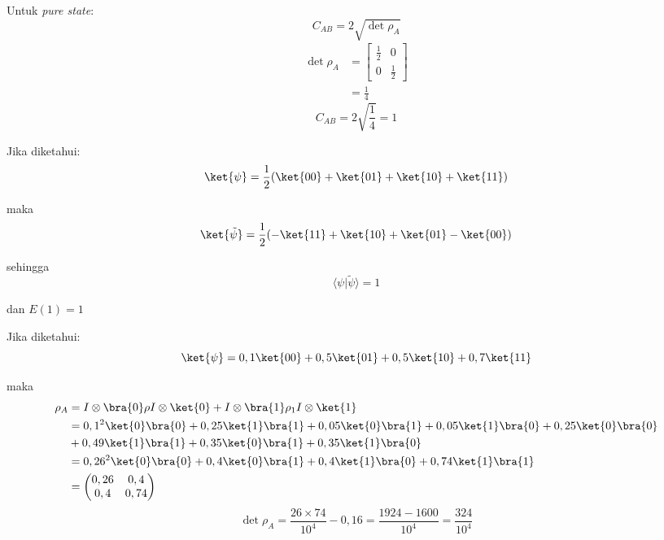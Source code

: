 \begin{enumerate}
	Untuk \textit{pure state}:
	\begin{equation}
		C_{AB}=2\sqrt{\det\rho_{A}}
	\end{equation}
	\begin{equation}
		\begin{aligned}
			\det\rho_{A}
			&=
			\begin{bmatrix}
				\frac{1}{2}&0\\
				0&\frac{1}{2}
			\end{bmatrix}\\
			&=\frac{1}{4}
		\end{aligned}
	\end{equation}
	\begin{equation}
		C_{AB}=2\sqrt{\frac{1}{4}}=1
	\end{equation}
	
	Jika diketahui:
	\begin{equation}
		\ket{\psi}=\frac{1}{2}(\ket{00}+\ket{01}+\ket{10}+\ket{11})
	\end{equation}
	
	maka
	\begin{equation}
		\ket{\tilde{\psi}}=\frac{1}{2}(-\ket{11}+\ket{10}+\ket{01}-\ket{00})
	\end{equation}
	
	sehingga
	\begin{equation}
		\langle\psi|\tilde{\psi}\rangle=1
	\end{equation}
	
	dan $E(1)=1$
	
	Jika diketahui:
	\begin{equation}
		\ket{\psi}=0,1\ket{00}+0,5\ket{01}+0,5\ket{10}+0,7\ket{11}
	\end{equation}
	
	maka
	\begin{equation}
		\begin{aligned}
			\rho_A
			&=I\otimes\bra{0}\rho I\otimes\ket{0} +I\otimes\bra{1}\rho_1I\otimes\ket{1}\\
			&=0,1^2\ket{0}\bra{0}+0,25\ket{1}\bra{1}+0,05\ket{0}\bra{1}+0,05\ket{1}\bra{0}+0,25\ket{0}\bra{0}\\
			&+0,49\ket{1}\bra{1}+0,35\ket{0}\bra{1}+0,35\ket{1}\bra{0}\\
			&=0,26^2\ket{0}\bra{0}+0,4\ket{0}\bra{1}+0,4\ket{1}\bra{0}+0,74\ket{1}\bra{1}\\
			&=
			\begin{pmatrix}
				0,26&0,4\\
				0,4&0,74
			\end{pmatrix}
		\end{aligned}
	\end{equation}
	\begin{equation}
		\det\rho_{A}=\frac{26\times74}{10^4}-0,16=\frac{1924-1600}{10^4}=\frac{324}{10^4}
	\end{equation}
	

\end{enumerate}
